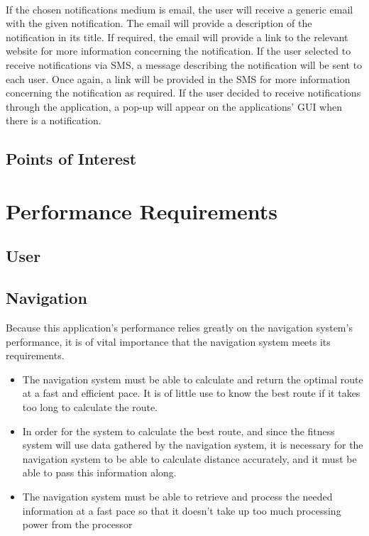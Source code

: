 \documentclass[runningheads,a4paper]{article}
\begin{document}
\mbox{}\\
If the chosen notifications medium is email, the user will receive a generic email with the given notification. The email will provide a description of the notification in its title. If required, the email will provide a link to the relevant website for more information concerning the notification. If the user selected to receive notifications via SMS, a message describing the notification will be sent to each user. Once again, a link will be provided in the SMS for more information concerning the notification as required. If the user decided to receive notifications through the application, a pop-up will appear on the applications’ GUI when there is a notification. 

\subsection{Points of Interest}


\section{Performance Requirements}

\subsection{User}
\subsection{Navigation}
Because this application’s performance relies greatly on the navigation system’s performance, it is of vital importance that the navigation system meets its requirements. 

\begin{itemize}
The Navigation System must have an accuracy radius of 3m to perform accurately indoors.

\item The navigation system must be able to calculate and return the optimal route at a fast and efficient pace. It is of little use to know the best route if it takes too long to calculate the route.

\item In order for the system to calculate the best route, and since the fitness system will use data gathered by the navigation system, it is necessary for the navigation system to be able to calculate distance accurately, and it must be able to pass this information along.

\item The navigation system must be able to retrieve and process the needed information at a fast pace so that it doesn’t take up too much processing power from the processor
\end{itemize}
\end{document}
